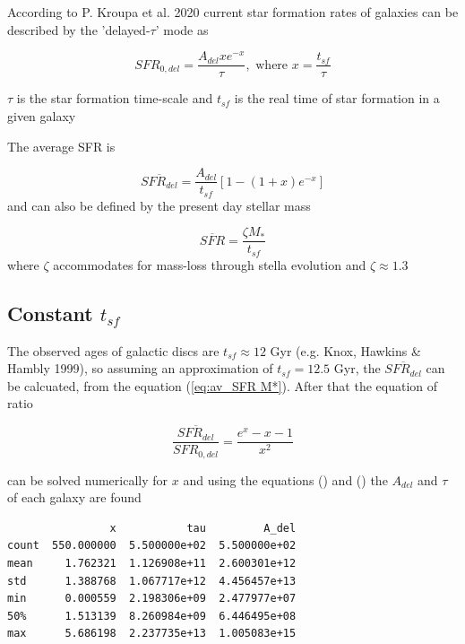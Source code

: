 \documentclass[a4paper]{article}
\begin{document}
According to P. Kroupa et al. 2020 current star formation rates of galaxies can be described by the 'delayed-\(\tau\)' mode as


\begin{equation} \label{eq:SFR}
SFR_{0,del}=\frac{A_{del}xe^{-x}}{\tau},\text{ where } x=\frac{t_{sf}}{\tau}
\end{equation}


\(\tau\) is the star formation time-scale and \(t_{sf}\) is the real time of star formation in a given galaxy

The average SFR is

\begin{equation}\label{eq:av_SFR-x}
\overline{SFR_{del}}=\frac{A_{del}}{t_{sf}}[1-(1+x)e^{-x}]
\end{equation}
and can also be defined by the present day stellar mass

\begin{equation}\label{eq:av_SFR M*}
    \overline{SFR}=\frac{\zeta M_*}{t_{sf}}
\end{equation}
where \(\zeta\) accommodates for mass-loss through stella evolution and \(\zeta\approx 1.3\)

\subsection{Constant \(t_{sf}\)}
\label{sec:org2e54374}
The observed ages of galactic discs are \(t_{sf}\approx 12\) Gyr (e.g. Knox, Hawkins \& Hambly 1999), so assuming an approximation of \(t_{sf}=12.5\) Gyr, the \(\overline{SFR_{del}}\) can be calcuated, from the equation (\ref{eq:av_SFR M*}). After that the equation of ratio


\begin{equation} \label{eq:ratio}
    \frac{\overline{SFR_{del}}}{SFR_{0,del}}=\frac{e^x-x-1}{x^2}
\end{equation}

can be solved numerically for \(x\) and using the equations () and () the \(A_{del}\) and \(\tau\) of each galaxy are found

\begin{verbatim}
                x           tau         A_del
count  550.000000  5.500000e+02  5.500000e+02
mean     1.762321  1.126908e+11  2.600301e+12
std      1.388768  1.067717e+12  4.456457e+13
min      0.000559  2.198306e+09  2.477977e+07
50%      1.513139  8.260984e+09  6.446495e+08
max      5.686198  2.237735e+13  1.005083e+15
\end{verbatim}
\end{document}
